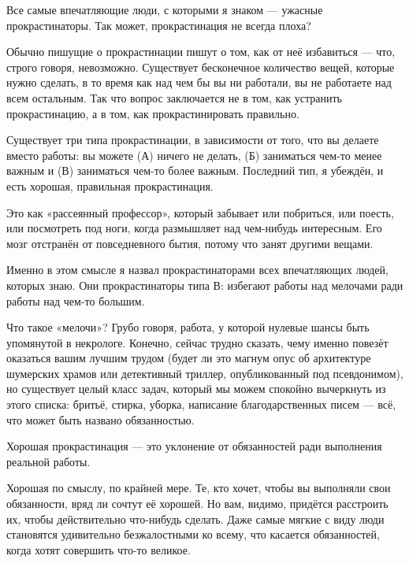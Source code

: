 \documentclass[ebook,12pt,oneside,openany]{memoir}
\begin{document}
\maketitle

Все самые впечатляющие люди, с которыми я знаком — ужасные
прокрастинаторы. Так может, прокрастинация не всегда плоха? \newline

Обычно пишущие о прокрастинации пишут о том, как от неё избавиться —
что, строго говоря, невозможно. Существует бесконечное количество
вещей, которые нужно сделать, в то время как над чем бы вы ни
работали, вы не работаете над всем остальным. Так что вопрос
заключается не в том, как устранить прокрастинацию, а в том, как
прокрастинировать правильно. \newline

Существует три типа прокрастинации, в зависимости от того, что вы
делаете вместо работы: вы можете (А) ничего не делать, (Б) заниматься
чем-то менее важным и (В) заниматься чем-то более важным. Последний
тип, я убеждён, и есть хорошая, правильная прокрастинация. \newline

Это как «рассеянный профессор», который забывает или побриться, или
поесть, или посмотреть под ноги, когда размышляет над чем-нибудь
интересным. Его мозг отстранён от повседневного бытия, потому что
занят другими вещами. \newline

Именно в этом смысле я назвал прокрастинаторами всех впечатляющих
людей, которых знаю. Они прокрастинаторы типа В: избегают работы над
мелочами ради работы над чем-то большим. \newline

Что такое «мелочи»? Грубо говоря, работа, у которой нулевые шансы быть
упомянутой в некрологе. Конечно, сейчас трудно сказать, чему именно
повезёт оказаться вашим лучшим трудом (будет ли это магнум опус об
архитектуре шумерских храмов или детективный триллер, опубликованный
под псевдонимом), но существует целый класс задач, который мы можем
спокойно вычеркнуть из этого списка: бритьё, стирка, уборка, написание
благодарственных писем — всё, что может быть названо обязанностью. \newline

Хорошая прокрастинация — это уклонение от обязанностей ради выполнения
реальной работы. \newline

Хорошая по смыслу, по крайней мере. Те, кто хочет, чтобы вы выполняли
свои обязанности, вряд ли сочтут её хорошей. Но вам, видимо, придётся
расстроить их, чтобы действительно что-нибудь сделать. Даже самые
мягкие с виду люди становятся удивительно безжалостными ко всему, что
касается обязанностей, когда хотят совершить что-то великое. \newline
\end{document}
